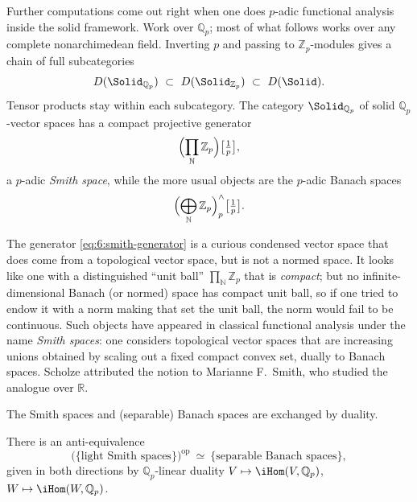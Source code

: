 Further computations come out right when one does $p$-adic functional analysis
inside the solid framework. Work over $\mathbb{Q}_p$; most of what follows works
over any complete nonarchimedean field. Inverting $p$ and passing to
$\mathbb{Z}_p$-modules gives a chain of full subcategories
\begin{equation*}
D(\Solid_{\mathbb{Q}_p})\ \subset\ D(\Solid_{\mathbb{Z}_p})\ \subset\ D(\Solid).
\end{equation*}
Tensor products stay within each subcategory. The category $\Solid_{\mathbb{Q}_p}$
of solid $\mathbb{Q}_p$-vector spaces has a compact projective generator
\begin{equation}
\label{eq:6:smith-generator}
\Bigl(\prod_{\mathbb{N}}\mathbb{Z}_p\Bigr)\bigl[\tfrac1p\bigr],
\end{equation}
a $p$-adic \emph{Smith space}, while the more usual objects are the $p$-adic
Banach spaces
\begin{equation*}
\Bigl(\bigoplus_{\mathbb{N}}\mathbb{Z}_p\Bigr)^{\wedge}_{p}\bigl[\tfrac1p\bigr].
\end{equation*}

\begin{remark}
\label{rmk:6:smith-not-normed}
The generator \eqref{eq:6:smith-generator} is a curious condensed vector space
that does come from a topological vector space, but is not a normed space. It
looks like one with a distinguished ``unit ball'' $\prod_{\mathbb{N}}\mathbb{Z}_p$
that is \emph{compact}; but no infinite-dimensional Banach (or normed) space has
compact unit ball, so if one tried to endow it with a norm making that set the
unit ball, the norm would fail to be continuous. Such objects have appeared in
classical functional analysis under the name \emph{Smith spaces}: one considers
topological vector spaces that are increasing unions obtained by scaling out a
fixed compact convex set, dually to Banach spaces. Scholze attributed the notion
to Marianne F.\ Smith, who studied the analogue over $\mathbb{R}$.
\end{remark}

The Smith spaces and (separable) Banach spaces are exchanged by duality.

\begin{proposition}
\label{prop:6:smith-banach}
There is an anti-equivalence
\begin{equation*}
\bigl(\{\text{light Smith spaces}\}\bigr)^{\mathrm{op}}\ \simeq\
\{\text{separable Banach spaces}\},
\end{equation*}
given in both directions by $\mathbb{Q}_p$-linear duality
$V\mapsto\iHom(V,\mathbb{Q}_p)$, $W\mapsto\iHom(W,\mathbb{Q}_p)$.
\end{proposition}

